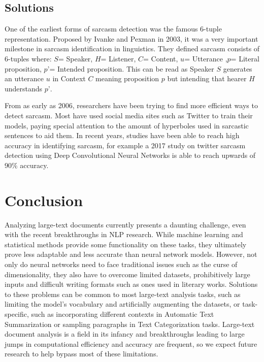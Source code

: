 \documentclass{article}
\begin{document}
	
	\subsection{Solutions}
	
	One of the earliest forms of sarcasm detection was the famous 6-tuple representation. Proposed by Ivanke and Pexman \cite{stacey} in 2003, it was a very important milestone in sarcasm identification in linguistics. They defined sarcasm consists of 6-tuples where: $S$= Speaker, $H$= Listener, $C$= Content, $u$= Utterance ,$p$= Literal proposition, $p’$= Intended proposition. This can be read as Speaker $S$ generates an utterance $u$ in Context $C$ meaning proposition $p$ but intending that hearer $H$ understands $p’$. \par
	
	From as early as 2006\cite{tepperman}, researchers have been trying to find more efficient ways to detect sarcasm. Most have used social media sites such as Twitter to train their models\cite{dmitry}, paying special attention to the amount of hyperboles used in sarcastic sentences to aid them. In recent years, studies have been able to reach high accuracy in identifying sarcasm, for example a 2017 study on twitter sarcasm detection using Deep Convolutional Neural Networks\cite{shelly} is able to reach upwards of 90\% accuracy.
	
	
	\section{Conclusion}
	
	Analyzing large-text documents currently presents a daunting challenge, even with the recent breakthroughs in NLP research. While machine learning and statistical methods provide some functionality on these tasks, they ultimately prove less adaptable and less accurate than neural network models. However, not only do neural networks need to face traditional issues such as the curse of dimensionality, they also have to overcome limited datasets, prohibitively large inputs and difficult writing formats such as ones used in literary works. Solutions to these problems can be common to most large-text analysis tasks, such as limiting the model's vocabulary and artificially augmenting the datasets, or task-specific, such as incorporating different contexts in Automatic Text Summarization or sampling paragraphs in Text Categorization tasks. Large-text document analysis is a field in its infancy and breakthroughs leading to large jumps in computational efficiency and accuracy are frequent, so we expect future research to help bypass most of these limitations.
	
	\printbibliography
	
	
\end{document}

